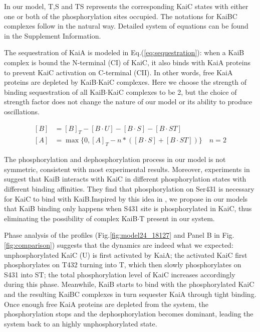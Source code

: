 \documentclass[a4paper,10pt]{article}
\numberwithin{equation}{section}
\begin{document}
In our model, T,S and TS represents the corresponding KaiC states with either one or both of the phosphorylation sites occupied. The notations for KaiBC complexes follow in the natural way. Detailed system of equations can be found in the Supplement Information.

The sequestration of KaiA is modeled in Eq.(\ref{eq:sequestration}): when a KaiB complex is bound the N-terminal (CI) of KaiC, it also binds with KaiA proteins to prevent KaiC activation on C-terminal (CII). In other words, free KaiA proteins are depleted by KaiB$\cdot$KaiC complexes. Here we choose the strength of binding sequestration of all KaiB$\cdot$KaiC complexes to be 2, but the choice of strength factor does not change the nature of our model or its ability to produce oscillations. %

\begin{align}\label{eq:sequestration}
[B]&=[B]_{T}-[B\cdot U]-[B\cdot S]-[B\cdot ST]\\ 
[A]&=\max\{0,[A]_{T}-n*([B\cdot S]+[B\cdot ST])\}\quad n=2
\end{align}


The phosphorylation and dephosphorylation process in our model is not symmetric, consistent with most experimental results.  Moreover, experiments in \citet{lin2014} suggest that KaiB interacts with KaiC in different phosphorylation states with different binding affinities. They find that phosphorylation on Ser431 is necessary for KaiC to bind with KaiB.Inspired by this idea in \citet{lin2014}, we propose in our models that KaiB binding only happens when S431 site is phosphorylated in KaiC, thus eliminating the possibility of complex KaiB$\cdot$T present in our system.






Phase analysis of the profiles (Fig.\ref{fig:model24_18127} and Panel B in Fig.\ref{fig:comparison}) suggests that the dynamics are indeed what we expected: unphosphorylated KaiC (U) is first activated by KaiA; the activated KaiC first phosphorylates on T432 turning into T, which then slowly phosphorylates on S431 into ST; the total phosphorylation level of KaiC increases accordingly during this phase. Meanwhile, KaiB starts to bind with the phosphorylated KaiC and the resulting KaiBC complexes in turn sequester KaiA through tight binding. Once enough free KaiA proteins are depleted from the system, the phosphorylation stops and the dephosphorylation becomes dominant, leading the system back to an highly unphosphorylated state. 
\end{document}
